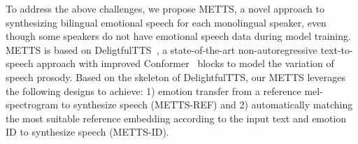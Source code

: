 \documentclass[journal,comsoc]{IEEEtran}
\begin{document}
\begin{itemize}
\end{itemize}

To address the above challenges, we propose METTS, a novel approach to synthesizing bilingual emotional speech for each monolingual speaker, even though some speakers do not have emotional speech data during model training. METTS is based on DeligtfulTTS~\cite{DBLP:journals/corr/abs-2110-12612}, a state-of-the-art non-autoregressive text-to-speech approach with improved Conformer~\cite{DBLP:conf/interspeech/GulatiQCPZYHWZW20} blocks to model the variation of speech prosody. Based on the skeleton of DelightfulTTS, our METTS leverages the following designs to achieve: 1) emotion transfer from a reference mel-spectrogram to synthesize speech (METTS-REF) and 2) automatically matching the most suitable reference embedding according to the input text and emotion ID to synthesize speech (METTS-ID).
\end{document}

